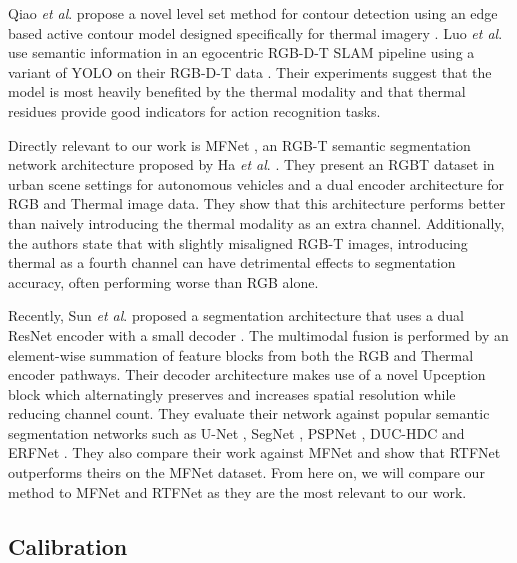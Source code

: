 \documentclass[letterpaper, 10 pt, conference]{ieeeconf}
\newcommand{\etal}{\textit{et al}. }
\begin{document}
Qiao \etal propose a novel level set method for contour detection using an edge based active contour model designed specifically for thermal imagery \cite{qiao2017thermal}. Luo \etal use semantic information in an egocentric RGB-D-T SLAM pipeline \cite{luo2017scene} using a variant of YOLO on their RGB-D-T data \cite{redmon2016you}. Their experiments suggest that the model is most heavily benefited by the thermal modality and that thermal residues provide good indicators for action recognition tasks.

Directly relevant to our work is MFNet \cite{ha2017mfnet}, an RGB-T semantic segmentation network architecture proposed by Ha \etal. They present an RGBT dataset in urban scene settings for autonomous vehicles and a dual encoder architecture for RGB and Thermal image data. They show that this architecture performs better than naively introducing the thermal modality as an extra channel. Additionally, the authors state that with slightly misaligned RGB-T images, introducing thermal as a fourth channel can have detrimental effects to segmentation accuracy, often performing worse than RGB alone.

Recently, Sun \etal proposed a segmentation architecture that uses a dual ResNet encoder with a small decoder \cite{sun2019rtfnet}. The multimodal fusion is performed by an element-wise summation of feature blocks from both the RGB and Thermal encoder pathways. Their decoder architecture makes use of a novel Upception block which alternatingly preserves and increases spatial resolution while reducing channel count. They evaluate their network against popular semantic segmentation networks such as U-Net \cite{ronneberger2015u}, SegNet \cite{badrinarayanan2017segnet}, PSPNet \cite{zhao2017pyramid}, DUC-HDC \cite{wang2018understanding} and ERFNet \cite{romera2017erfnet}. They also compare their work against MFNet and show that RTFNet outperforms theirs on the MFNet dataset. From here on, we will compare our method to MFNet and RTFNet as they are the most relevant to our work.

\subsection{Calibration}
\end{document}
